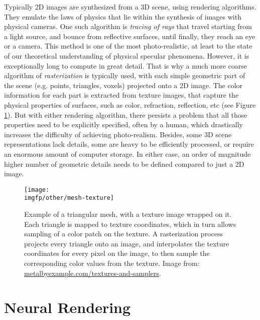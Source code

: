 Typically 2D images are synthesized from a 3D scene, using rendering algorithms. They emulate the laws of physics that lie within the synthesis of images with physical cameras. One such algorithm is \textit{tracing of rays} that travel starting from a light source, and bounce from reflective surfaces, until finally, they reach an eye or a camera. This method is one of the most photo-realistic, at least to the state of our theoretical understanding of physical specular phenomena. However, it is exceptionally long to compute in great detail. That is why a much more coarse algorithm of \textit{rasterization} is typically used, with each simple geometric part of the scene (e.g. points, triangles, voxels) projected onto a 2D image. The color information for each part is extracted from texture images, that capture the physical properties of surfaces, such as color, refraction, reflection, etc (see Figure \ref{intro:fig:mesh-texture}). But with either rendering algorithm, there persists a problem that all those properties need to be explicitly specified, often by a human, which drastically increases the difficulty of achieving photo-realism. Besides, some 3D scene representations lack details, some are heavy to be efficiently processed, or require an enormous amount of computer storage. In either case, an order of magnitude higher number of geometric details needs to be defined compared to just a 2D image. 

\begin{figure}[h!]
	\centering
	\texttt{[image: \\imgfp/other/mesh-texture]}
	\caption{Example of a triangular mesh, with a texture image wrapped on it. Each triangle is mapped to texture coordinates, which in turn allows sampling of a color patch on the texture. A rasterization process projects every triangle onto an image, and interpolates the texture coordinates for every pixel on the image, to then sample the corresponding color values from the texture. Image from: \href{https://metalbyexample.com/textures-and-samplers/}{metalbyexample.com/textures-and-samplers}.}
	\label{intro:fig:mesh-texture}
\end{figure}


\section{Neural Rendering}\label{intro:nrender}

